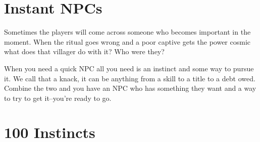 \section{Instant NPCs}


 Sometimes the players will come across someone who becomes important in the moment. When the ritual goes wrong and a poor captive gets the power cosmic what does that villager do with it? Who were they?


 When you need a quick NPC all you need is an instinct and some way to pursue it. We call that a knack, it can be anything from a skill to a title to a debt owed. Combine the two and you have an NPC who has something they want and a way to try to get it--you're ready to go.
\section{100 Instincts}
